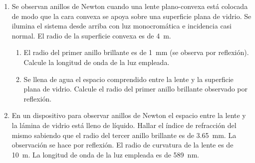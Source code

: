 \documentclass[11pt,spanish,a4paper]{article}
\begin{document}
\begin{enumerate}
\item
Se observan anillos de Newton cuando una lente plano-convexa está colocada de modo que la cara convexa se apoya sobre una superficie plana de vidrio.
Se ilumina el sistema desde arriba con luz monocromática e incidencia casi normal.
El radio de la superficie convexa es de \SI{4}{\metre}.
\begin{enumerate}
	\item El radio del primer anillo brillante es de \SI{1}{\milli\metre} (se observa por reflexión).
Calcule la longitud de onda de la luz empleada.
	\item Se llena de agua el espacio comprendido entre la lente y la superficie plana de vidrio.
Calcule el radio del primer anillo brillante observado por reflexión. 
\end{enumerate}


\item En un dispositivo para observar anillos de Newton el espacio entre la lente y la lámina de vidrio está lleno de líquido.
Hallar el índice de refracción del mismo sabiendo que el radio del tercer anillo brillante es de \SI{3.65}{\milli\metre}.
La observación se hace por reflexión.
El radio de curvatura de la lente es de \SI{10}{\metre}.
La longitud de onda de la luz empleada es de \SI{589}{\nano\metre}.


\end{enumerate}
\end{document}
